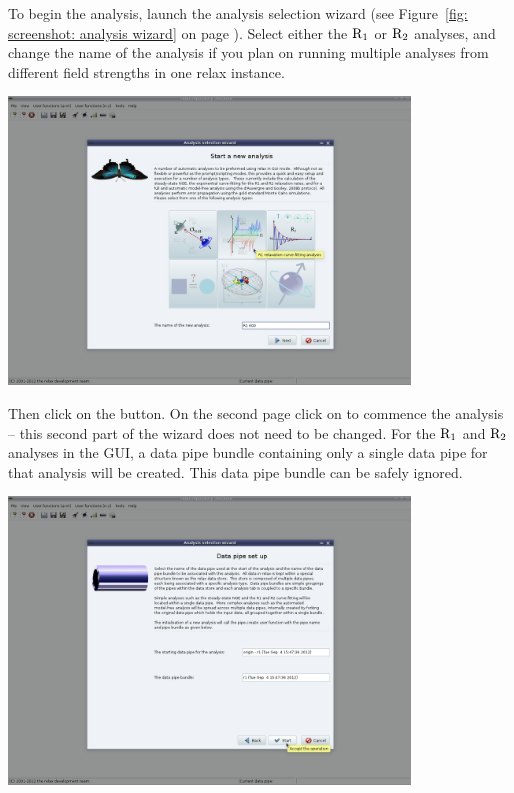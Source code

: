 To begin the analysis, launch the analysis selection wizard (see Figure~\ref{fig: screenshot: analysis wizard} on page \pageref{fig: screenshot: analysis wizard}).  Select either the $\mathrm{R}_1$ or $\mathrm{R}_2$ analyses, and change the name of the analysis if you plan on running multiple analyses from different field strengths in one relax instance.

\begin{minipage}[h]{\linewidth}
\centerline{\includegraphics[width=0.8\textwidth, bb=14 14 1415 1019]{graphics/screenshots/r1_analysis/analysis_wizard1}}
\end{minipage}

Then click on the  button.  On the second page click on  to commence the analysis -- this second part of the wizard does not need to be changed.  For the $\mathrm{R}_1$ and $\mathrm{R}_2$ analyses in the GUI, a data pipe bundle containing only a single data pipe for that analysis will be created.  This data pipe bundle can be safely ignored.

\begin{minipage}[h]{\linewidth}
\centerline{\includegraphics[width=0.8\textwidth, bb=14 14 1415 1019]{graphics/screenshots/r1_analysis/analysis_wizard2}}
\end{minipage}


